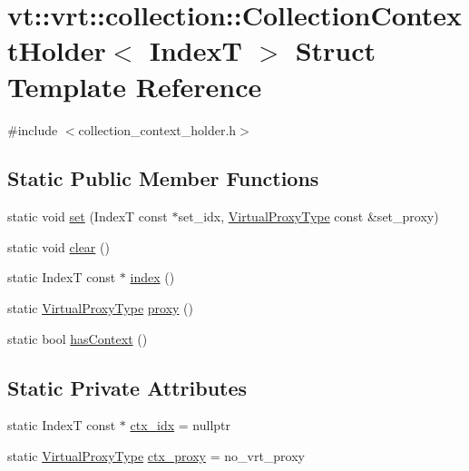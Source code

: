 \hypertarget{structvt_1_1vrt_1_1collection_1_1_collection_context_holder}{}\section{vt\+:\+:vrt\+:\+:collection\+:\+:Collection\+Context\+Holder$<$ IndexT $>$ Struct Template Reference}
\label{structvt_1_1vrt_1_1collection_1_1_collection_context_holder}


{\ttfamily \#include $<$collection\+\_\+context\+\_\+holder.\+h$>$}

\subsection*{Static Public Member Functions}
\begin{DoxyCompactItemize}
\item 
static void \hyperlink{structvt_1_1vrt_1_1collection_1_1_collection_context_holder_a3872e6e9b94769d47dcf6806e80f4630}{set} (IndexT const $\ast$set\+\_\+idx, \hyperlink{namespacevt_a1b417dd5d684f045bb58a0ede70045ac}{Virtual\+Proxy\+Type} const \&set\+\_\+proxy)
\item 
static void \hyperlink{structvt_1_1vrt_1_1collection_1_1_collection_context_holder_aa332e0b283fb66488857c9ed80ecaeb7}{clear} ()
\item 
static IndexT const  $\ast$ \hyperlink{structvt_1_1vrt_1_1collection_1_1_collection_context_holder_adb344b203dd74784b01d4b367ca0e82f}{index} ()
\item 
static \hyperlink{namespacevt_a1b417dd5d684f045bb58a0ede70045ac}{Virtual\+Proxy\+Type} \hyperlink{structvt_1_1vrt_1_1collection_1_1_collection_context_holder_a3221a65e68413ee41042e2d5dea74ef5}{proxy} ()
\item 
static bool \hyperlink{structvt_1_1vrt_1_1collection_1_1_collection_context_holder_ab6a68b761d25786dd17cca35604efcba}{has\+Context} ()
\end{DoxyCompactItemize}
\subsection*{Static Private Attributes}
\begin{DoxyCompactItemize}
\item 
static IndexT const  $\ast$ \hyperlink{structvt_1_1vrt_1_1collection_1_1_collection_context_holder_a404e476bc601208c10669aca436e1ac6}{ctx\+\_\+idx} = nullptr
\item 
static \hyperlink{namespacevt_a1b417dd5d684f045bb58a0ede70045ac}{Virtual\+Proxy\+Type} \hyperlink{structvt_1_1vrt_1_1collection_1_1_collection_context_holder_ad375fbfa1b642bbff3e824ab56abedb0}{ctx\+\_\+proxy} = no\+\_\+vrt\+\_\+proxy
\end{DoxyCompactItemize}


